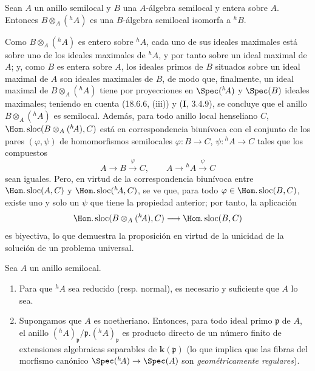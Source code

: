 \begin{proposition}[18.6.8]
\label{IV.18.6.8}
Sean $A$ un anillo semilocal y $B$ una $A$-álgebra semilocal y entera sobre $A$. Entonces $B\otimes_A({}^h\!A)$ es una $B$-álgebra semilocal isomorfa a ${}^h\!B$.
\end{proposition}

Como $B\otimes_A({}^h\!A)$ es entero sobre ${}^h\!A$, cada uno de sus ideales maximales está sobre uno de los ideales maximales de ${}^h\!A$, y por tanto sobre un ideal maximal de $A$; y, como $B$ es entera sobre $A$, los ideales primos de $B$ situados sobre un ideal maximal de $A$ son ideales maximales de $B$, de modo que, finalmente, un ideal maximal de $B\otimes_A({}^h\!A)$ tiene por proyecciones en $\Spec({}^h\!A)$ y $\Spec(B)$ ideales maximales; teniendo en cuenta (18.6.6, (iii)) y (\textbf I, 3.4.9), se concluye que el anillo $B\otimes_A({}^h\!A)$ es semilocal. Además, para todo anillo local henseliano $C$, $\Hom.\operatorname{sloc}(B\otimes_A({}^h\!A),C)$ está en correspondencia biunívoca con el conjunto de los pares $(\varphi,\psi)$ de homomorfismos semilocales $\varphi:B\to C$, $\psi:{}^h\!A\to C$ tales que los compuestos
\[
  A\longrightarrow B\xrightarrow{\varphi}C,\qquad
  A\longrightarrow{}^h\!A\xrightarrow{\psi}C
\]
sean iguales. Pero, en virtud de la correspondencia biunívoca entre $\Hom.\operatorname{sloc}(A,C)$ y $\Hom.\operatorname{sloc}({}^h\!A,C)$, se ve que, para todo $\varphi\in\Hom.\operatorname{sloc}(B,C)$, existe uno y solo un $\psi$ que tiene la propiedad anterior; por tanto, la aplicación
\[
  \Hom.\operatorname{sloc}(B\otimes_A({}^h\!A),C)\longrightarrow\Hom.\operatorname{sloc}(B,C)
\]
es biyectiva, lo que demuestra la proposición en virtud de la unicidad de la solución de un problema universal.

\begin{theorem}[18.6.9]
\label{IV.18.6.9}
Sea $A$ un anillo semilocal.
\begin{enumerate}
  \item[\textup{(i)}] Para que ${}^h\!A$ sea reducido \textup{(resp.} normal\textup{)}, es necesario y suficiente que $A$ lo sea.
  \item[\textup{(ii)}] Supongamos que $A$ es noetheriano. Entonces, para todo ideal primo $\mathfrak p$ de $A$, el anillo $({}^h\!A)_{\mathfrak p}/\mathfrak p.({}^h\!A)_{\mathfrak p}$ es producto directo de un número finito de extensiones algebraicas separables de $\boldsymbol k(\mathfrak p)$ \textup{(lo que implica que las fibras del morfismo canónico $\Spec({}^h\!A)\to\Spec(A)$ son \emph{geométricamente regulares})}.
\end{enumerate}
\end{theorem}

